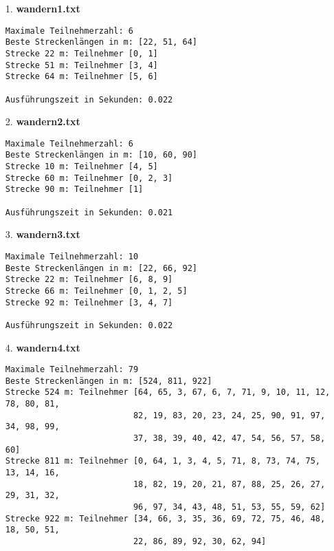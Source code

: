 \documentclass[a4paper,10pt,ngerman]{scrartcl}
\begin{document}
\begin{itemize}
  \item [1.] \textbf{wandern1.txt}
  \begin{verbatim}
Maximale Teilnehmerzahl: 6
Beste Streckenlängen in m: [22, 51, 64]
Strecke 22 m: Teilnehmer [0, 1]
Strecke 51 m: Teilnehmer [3, 4]
Strecke 64 m: Teilnehmer [5, 6]

Ausführungszeit in Sekunden: 0.022
  \end{verbatim}
  \item [2.] \textbf{wandern2.txt}
  \begin{verbatim}
Maximale Teilnehmerzahl: 6
Beste Streckenlängen in m: [10, 60, 90]
Strecke 10 m: Teilnehmer [4, 5]
Strecke 60 m: Teilnehmer [0, 2, 3]
Strecke 90 m: Teilnehmer [1]

Ausführungszeit in Sekunden: 0.021
  \end{verbatim}
  \item [3.] \textbf{wandern3.txt}
  \begin{verbatim}
Maximale Teilnehmerzahl: 10
Beste Streckenlängen in m: [22, 66, 92]
Strecke 22 m: Teilnehmer [6, 8, 9]
Strecke 66 m: Teilnehmer [0, 1, 2, 5]
Strecke 92 m: Teilnehmer [3, 4, 7]

Ausführungszeit in Sekunden: 0.022
  \end{verbatim}
  \item [4.] \textbf{wandern4.txt}
  \begin{verbatim}
Maximale Teilnehmerzahl: 79
Beste Streckenlängen in m: [524, 811, 922]
Strecke 524 m: Teilnehmer [64, 65, 3, 67, 6, 7, 71, 9, 10, 11, 12, 78, 80, 81, 
                          82, 19, 83, 20, 23, 24, 25, 90, 91, 97, 34, 98, 99, 
                          37, 38, 39, 40, 42, 47, 54, 56, 57, 58, 60]
Strecke 811 m: Teilnehmer [0, 64, 1, 3, 4, 5, 71, 8, 73, 74, 75, 13, 14, 16, 
                          18, 82, 19, 20, 21, 87, 88, 25, 26, 27, 29, 31, 32, 
                          96, 97, 34, 43, 48, 51, 53, 55, 59, 62]
Strecke 922 m: Teilnehmer [34, 66, 3, 35, 36, 69, 72, 75, 46, 48, 18, 50, 51, 
                          22, 86, 89, 92, 30, 62, 94]


\end{verbatim}
\end{itemize}
\end{document}
